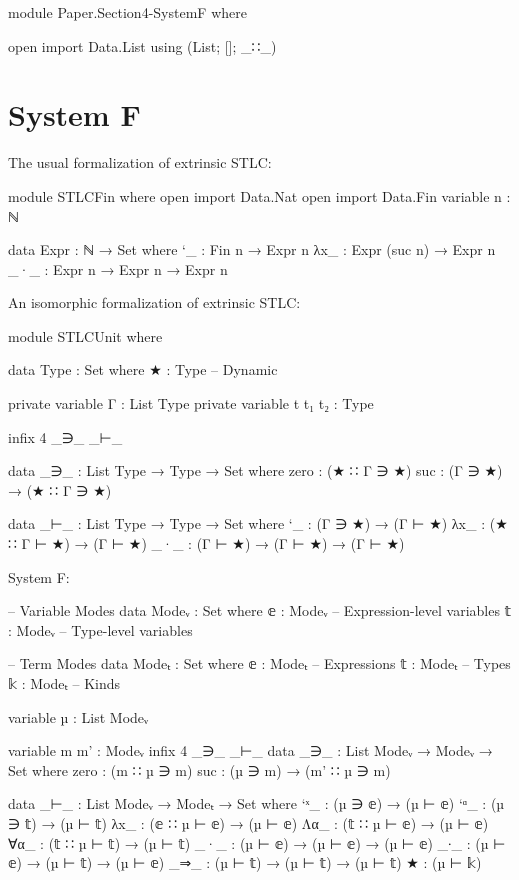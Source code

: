 \begin{code}[hide]
module Paper.Section4-SystemF where

open import Data.List using (List; []; _∷_)
\end{code}

\newpage
\section{System F}

The usual formalization of extrinsic STLC:
\begin{code}[hide]
module STLCFin where
  open import Data.Nat
  open import Data.Fin
  variable n : ℕ
\end{code}
\begin{code}
  data Expr : ℕ → Set where
    `_   : Fin n → Expr n
    λx_  : Expr (suc n) → Expr n
    _·_  : Expr n → Expr n → Expr n
\end{code}

An isomorphic formalization of extrinsic STLC:
\begin{code}[hide]
module STLCUnit where
\end{code}
\begin{code}
  data Type : Set where
    ★ : Type -- Dynamic
\end{code}
\begin{code}[hide]
  private variable Γ : List Type
  private variable t t₁ t₂ : Type

  infix  4  _∋_  _⊢_

  data _∋_ : List Type → Type → Set where
    zero  : (★ ∷ Γ ∋ ★)
    suc   : (Γ ∋ ★) → (★ ∷ Γ ∋ ★)
\end{code}
\begin{code}
  data _⊢_ : List Type → Type → Set where
    `_   : (Γ ∋ ★) → (Γ ⊢ ★)
    λx_  : (★ ∷ Γ ⊢ ★) → (Γ ⊢ ★)
    _·_  : (Γ ⊢ ★) → (Γ ⊢ ★) → (Γ ⊢ ★)
\end{code}

System F:

\begin{code}
-- Variable Modes
data Modeᵥ : Set where
  𝕖 : Modeᵥ  -- Expression-level variables
  𝕥 : Modeᵥ  -- Type-level variables

-- Term Modes
data Modeₜ : Set where
  𝕖 : Modeₜ  -- Expressions
  𝕥 : Modeₜ  -- Types
  𝕜 : Modeₜ  -- Kinds

variable µ : List Modeᵥ
\end{code}
\begin{code}[hide]
variable m m' : Modeᵥ
infix  4  _∋_  _⊢_
data _∋_ : List Modeᵥ → Modeᵥ → Set where
  zero  : (m ∷ µ ∋ m)
  suc   : (µ ∋ m) → (m' ∷ µ ∋ m)
\end{code}
\begin{code}
data _⊢_ : List Modeᵥ → Modeₜ → Set where
  `ˣ_   : (µ ∋ 𝕖) → (µ ⊢ 𝕖)
  `ᵅ_   : (µ ∋ 𝕥) → (µ ⊢ 𝕥)
  λx_   : (𝕖 ∷ µ ⊢ 𝕖) → (µ ⊢ 𝕖)
  Λα_   : (𝕥 ∷ µ ⊢ 𝕖) → (µ ⊢ 𝕖)
  ∀α_   : (𝕥 ∷ µ ⊢ 𝕥) → (µ ⊢ 𝕥)
  _·_   : (µ ⊢ 𝕖) → (µ ⊢ 𝕖) → (µ ⊢ 𝕖)
  _∙_   : (µ ⊢ 𝕖) → (µ ⊢ 𝕥) → (µ ⊢ 𝕖)
  _⇒_   : (µ ⊢ 𝕥) → (µ ⊢ 𝕥) → (µ ⊢ 𝕥)
  ★     : (µ ⊢ 𝕜)
\end{code}
